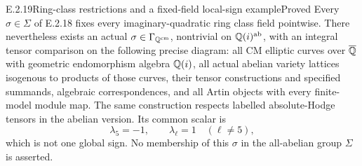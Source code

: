 \begin{result}{E.2.19}{Ring-class restrictions and a fixed-field local-sign example}{Proved}
Every \(\sigma\in\Sigma\) of E.2.18 fixes every imaginary-quadratic
ring class field pointwise. There nevertheless exists an actual
\(\sigma\in\Gamma_{\mathbb Q^{\mathrm{cm}}}\), nontrivial on
\(\mathbb Q(i)^{\mathrm{ab}}\), with an integral tensor comparison on the
following precise diagram: all CM elliptic curves over \(\overline{\mathbb Q}\)
with geometric endomorphism algebra \(\mathbb Q(i)\), all actual abelian
variety lattices isogenous to products of those curves, their
tensor constructions and specified summands, algebraic
correspondences, and all Artin objects with every finite-model
module map. The same construction respects labelled
absolute-Hodge tensors in the abelian version.
Its common scalar is
\[
 \lambda_5=-1,\qquad \lambda_\ell=1\quad(\ell\ne5),
 \tag{E.2.19a}
\]
which is not one global sign. No membership of this \(\sigma\)
in the all-abelian group \(\Sigma\) is asserted.
\end{result}
